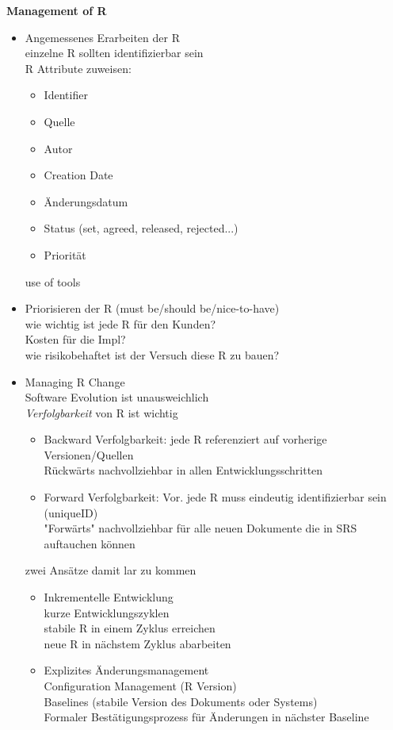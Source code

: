 \textbf{Management of R}
\begin{itemize}
	\item Angemessenes Erarbeiten der R\\
	einzelne R sollten identifizierbar sein\\
	R Attribute zuweisen:
	\begin{itemize}
		\item Identifier
		\item Quelle
		\item Autor
		\item Creation Date
		\item Änderungsdatum
		\item Status (set, agreed, released, rejected...)
		\item Priorität
	\end{itemize}
	use of tools
	
	\item Priorisieren der R (must be/should be/nice-to-have)\\
	wie wichtig ist jede R für den Kunden?\\
	Kosten für die Impl?\\
	wie risikobehaftet ist der Versuch diese R zu bauen?
	
	\item Managing R Change\\
	Software Evolution ist unausweichlich\\
	\textit{Verfolgbarkeit }von R ist wichtig
	\begin{itemize}
		\item Backward Verfolgbarkeit: jede R referenziert auf vorherige Versionen/Quellen\\
		Rückwärts nachvollziehbar in allen Entwicklungsschritten
		\item Forward Verfolgbarkeit: Vor. jede R muss eindeutig identifizierbar sein (uniqueID)\\
		"Forwärts" nachvollziehbar für alle neuen Dokumente die in SRS auftauchen können\\
		
 	\end{itemize}
	zwei Ansätze damit lar zu kommen
	\begin{itemize}
		\item Inkrementelle Entwicklung\\
		kurze Entwicklungszyklen\\
		stabile R in einem Zyklus erreichen\\
		neue R in nächstem Zyklus abarbeiten
		
		\item Explizites Änderungsmanagement\\
		Configuration Management (R Version)\\
		Baselines (stabile Version des Dokuments oder Systems)\\
		Formaler Bestätigungsprozess für Änderungen in nächster Baseline
	\end{itemize}
\end{itemize}